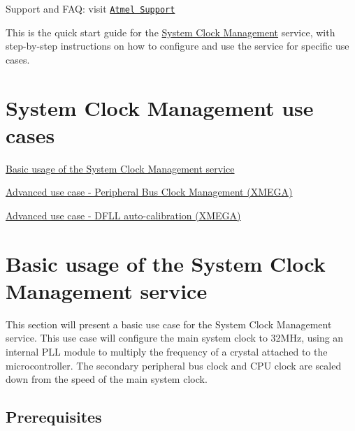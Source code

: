 Support and F\-A\-Q\-: visit \href{http://www.atmel.com/design-support/}{\tt Atmel Support}

This is the quick start guide for the \hyperlink{group__sysclk__group}{System Clock Management} service, with step-\/by-\/step instructions on how to configure and use the service for specific use cases.\hypertarget{sysclk_quickstart_sysclk_quickstart_usecases}{}\section{System Clock Management use cases}\label{sysclk_quickstart_sysclk_quickstart_usecases}

\begin{DoxyItemize}
\item \hyperlink{sysclk_quickstart_sysclk_quickstart_basic}{Basic usage of the System Clock Management service}
\item \hyperlink{sysclk_quickstart_use_case_2}{Advanced use case -\/ Peripheral Bus Clock Management (X\-M\-E\-G\-A)}
\item \hyperlink{sysclk_quickstart_use_case_3}{Advanced use case -\/ D\-F\-L\-L auto-\/calibration (X\-M\-E\-G\-A)}
\end{DoxyItemize}\hypertarget{sysclk_quickstart_sysclk_quickstart_basic}{}\section{Basic usage of the System Clock Management service}\label{sysclk_quickstart_sysclk_quickstart_basic}
This section will present a basic use case for the System Clock Management service. This use case will configure the main system clock to 32\-M\-Hz, using an internal P\-L\-L module to multiply the frequency of a crystal attached to the microcontroller. The secondary peripheral bus clock and C\-P\-U clock are scaled down from the speed of the main system clock.\hypertarget{sysclk_quickstart_sysclk_quickstart_use_case_1_prereq}{}\subsection{Prerequisites}\label{sysclk_quickstart_sysclk_quickstart_use_case_1_prereq}

